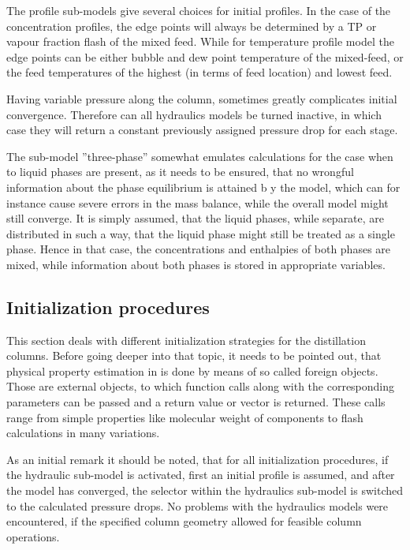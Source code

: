     The profile sub-models give several choices for initial profiles. In the case of the concentration profiles, the edge points 
    will always be determined by a TP or vapour fraction flash of the mixed feed. While for temperature profile model the 
    edge points can be either bubble and dew point temperature of the mixed-feed, or the feed temperatures of the highest 
    (in terms of feed location) and lowest feed. 
    
    Having variable pressure along the column, sometimes greatly complicates initial convergence. Therefore can all hydraulics 
    models be turned inactive, in which case they will return a constant previously assigned pressure drop for each stage.  
    
    The sub-model ''three-phase'' somewhat emulates calculations for the case when to liquid phases are present, 
    as it needs to be ensured, that no wrongful information about the phase equilibrium is attained b y
    the model, which can for instance cause severe errors in the mass balance, while the overall model 
    might still converge. It is simply assumed, that the liquid phases, while separate, are distributed 
    in such a way, that the liquid phase might still be treated as a single phase. Hence in that case, 
    the concentrations and enthalpies of both phases are mixed, while information about both phases is stored 
    in appropriate variables. 
    
\subsection{Initialization procedures}
    
    This section deals with different initialization strategies for the distillation columns. Before going 
    deeper into that topic, it needs to be pointed out, that physical property estimation in \gproms is done
    by means of so called foreign objects. Those are external objects, to which function calls along with 
    the corresponding parameters can be passed and a return value or vector is returned. These calls range 
    from simple properties like molecular weight of components to flash calculations in many variations. 
    
    As an initial remark it should be noted, that for all initialization procedures, if the hydraulic 
    sub-model is activated, first an initial profile is assumed, and after the model has converged, 
    the selector within the hydraulics sub-model is switched to the calculated pressure drops. No problems 
    with the hydraulics models were encountered, if the specified column geometry allowed for feasible 
    column operations. 
    
